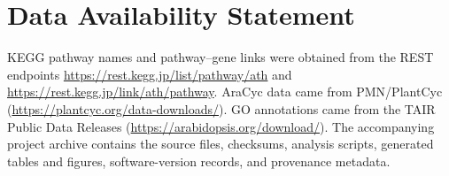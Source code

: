 \documentclass[12pt,twoside]{article}
\begin{document}
\section*{Data Availability Statement}
KEGG pathway names and pathway--gene links were obtained from the REST endpoints
\url{https://rest.kegg.jp/list/pathway/ath} and
\url{https://rest.kegg.jp/link/ath/pathway}. AraCyc data came from PMN/PlantCyc
(\url{https://plantcyc.org/data-downloads/}). GO annotations came from the TAIR
Public Data Releases (\url{https://arabidopsis.org/download/}). The accompanying
project archive contains the source files, checksums, analysis scripts, generated
tables and figures, software-version records, and provenance metadata.



\end{document}
